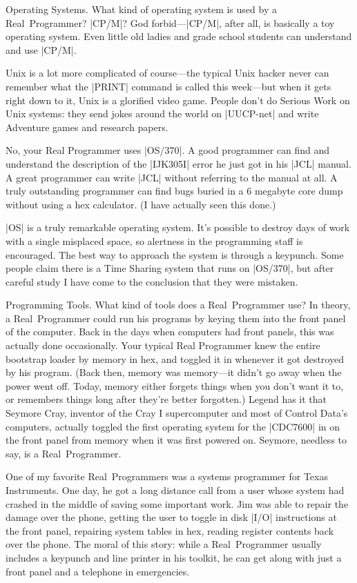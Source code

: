 \sect Operating Systems.
What kind of operating system is used by a Real~Programmer? |CP/M|? God
forbid---|CP/M|, after all, is basically a toy operating system. Even
little old ladies and grade school students can understand and use
|CP/M|.

Unix is a lot more complicated of course---the typical Unix hacker
never can remember what the |PRINT| command is called this week---but
when it gets right down to it, Unix is a glorified video game. People
don't do Serious Work on Unix systems: they send jokes around the
world on |UUCP-net| and write Adventure games and research papers.

No, your Real Programmer uses |OS/370|. A good programmer can find and
understand the description of the |IJK305I| error he just got in his |JCL|
manual. A great programmer can write |JCL| without referring to the
manual at all. A truly outstanding programmer can find bugs buried in
a 6 megabyte core dump without using a hex calculator. (I have
actually seen this done.)

|OS| is a truly remarkable operating system. It's possible to destroy
days of work with a single misplaced space, so alertness in the
programming staff is encouraged. The best way to approach the system
is through a keypunch. Some people claim there is a Time Sharing
system that runs on |OS/370|, but after careful study I have come to the
conclusion that they were mistaken.

\sect Programming Tools.
What kind of tools does a Real~Programmer use? In theory, a Real~Programmer
could run his programs by keying them into the front panel
of the computer. Back in the days when computers had front panels,
this was actually done occasionally. Your typical Real Programmer knew
the entire bootstrap loader by memory in hex, and toggled it in
whenever it got destroyed by his program. (Back then, memory was
memory---it didn't go away when the power went off. Today, memory
either forgets things when you don't want it to, or remembers things
long after they're better forgotten.) Legend has it that Seymore Cray,
inventor of the Cray I supercomputer and most of Control Data's
computers, actually toggled the first operating system for the |CDC7600|
in on the front panel from memory when it was first powered
on. Seymore, needless to say, is a Real~Programmer.

One of my favorite Real~Programmers was a systems programmer for Texas
Instruments. One day, he got a long distance call from a user whose
system had crashed in the middle of saving some important work. Jim
was able to repair the damage over the phone, getting the user to
toggle in disk |I/O| instructions at the front panel, repairing system
tables in hex, reading register contents back over the phone. The
moral of this story: while a Real~Programmer usually includes a
keypunch and line printer in his toolkit, he can get along with just a
front panel and a telephone in emergencies.


